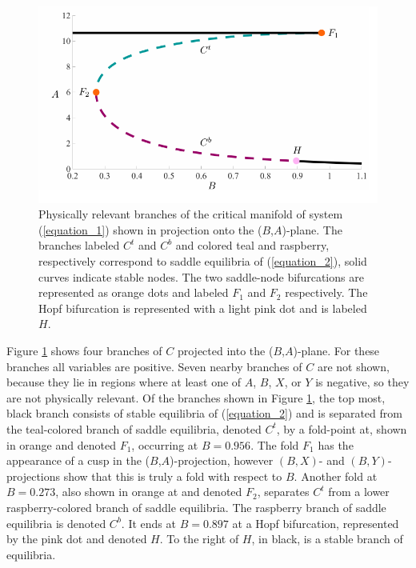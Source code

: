 \documentclass{ws-ijbc}
\begin{document}
\begin{figure}[!t]
\begin{center}
\includegraphics[page=1, width=\textwidth]{figures.pdf}
\end{center}
\caption{Physically relevant branches of the critical manifold of system (\ref{equation_1}) shown in projection onto the ($B$,$A$)-plane.  The branches labeled $C^t$ and $C^b$ and colored teal and raspberry, respectively correspond to saddle equilibria of (\ref{equation_2}), solid curves indicate stable nodes.  The two saddle-node bifurcations are represented as orange dots and labeled $F_1$ and $F_2$ respectively.  The Hopf bifurcation is represented with a light pink dot and is labeled $H$.}
\label{critical_figure}
\end{figure}

Figure \ref{critical_figure} shows four branches of $C$ projected into the ($B$,$A$)-plane.  For these branches all variables are positive.  Seven nearby branches of $C$ are not shown, because they lie in regions where at least one of $A$, $B$, $X$, or $Y$ is negative, so they are not physically relevant.  Of the branches shown in Figure \ref{critical_figure}, the top most, black branch consists of stable equilibria of (\ref{equation_2}) and is separated from the teal-colored branch of saddle equilibria, denoted $C^t$, by a fold-point at, shown in orange and denoted $F_1$, occurring at $B = 0.956$.  The fold $F_1$ has the appearance of a cusp in the ($B$,$A$)-projection, however $(B,X)$- and $(B,Y)$- projections show that this is truly a fold with respect to $B$.  Another fold at $B = 0.273$, also shown in orange at and denoted $F_2$, separates $C^t$ from a lower raspberry-colored branch of saddle equilibria.  The raspberry branch of saddle equilibria is denoted $C^b$.  It ends at $B = 0.897$ at a Hopf bifurcation, represented by the pink dot and denoted $H$.  To the right of $H$, in black, is a stable branch of equilibria.  
    
\end{document}
